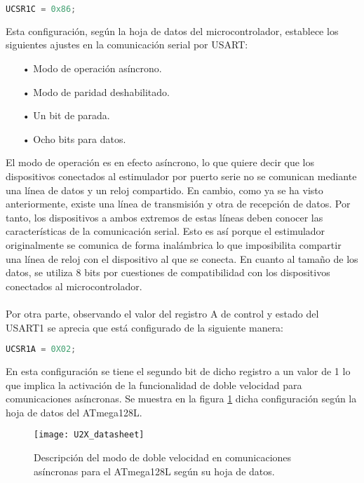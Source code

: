 \begin{lstlisting}[language=C++,breaklines]
UCSR1C = 0x86;
\end{lstlisting}

Esta configuración, según la hoja de datos del microcontrolador, establece los siguientes ajustes en la comunicación serial por USART:

\begin{itemize}
\item[•] Modo de operación asíncrono.
\item[•] Modo de paridad deshabilitado.
\item[•] Un bit de parada.
\item[•] Ocho bits para datos.
\end{itemize}
 
El modo de operación es en efecto asíncrono, lo que quiere decir que los dispositivos conectados al estimulador por puerto serie no se comunican mediante una línea de datos y un reloj compartido. En cambio, como ya se ha visto anteriormente, existe una línea de transmisión y otra de recepción de datos. Por tanto, los dispositivos a ambos extremos de estas líneas deben conocer las características de la comunicación serial. Esto es así porque el estimulador originalmente se comunica de forma inalámbrica lo que imposibilita compartir una línea de reloj con el dispositivo al que se conecta. En cuanto al tamaño de los datos, se utiliza 8 bits por cuestiones de compatibilidad con los dispositivos conectados al microcontrolador.
\\
\\
Por otra parte, observando el valor del registro A de control y estado del USART1 se aprecia que está configurado de la siguiente manera: 

\begin{lstlisting}[language=C++,breaklines]
UCSR1A = 0X02;
\end{lstlisting}

En esta configuración se tiene el segundo bit de dicho registro a un valor de 1 lo que implica la activación de la funcionalidad de doble velocidad para comunicaciones asíncronas. Se muestra en la figura \ref{fig:U2X_datasheet} dicha configuración según la hoja de datos del ATmega128L.\\

\begin{figure}[!htb]
\centering
\texttt{[image: U2X\_datasheet]}
  \caption{Descripción del modo de doble velocidad en comunicaciones asíncronas para el ATmega128L según su hoja de datos.}\label{fig:U2X_datasheet}
\end{figure}

